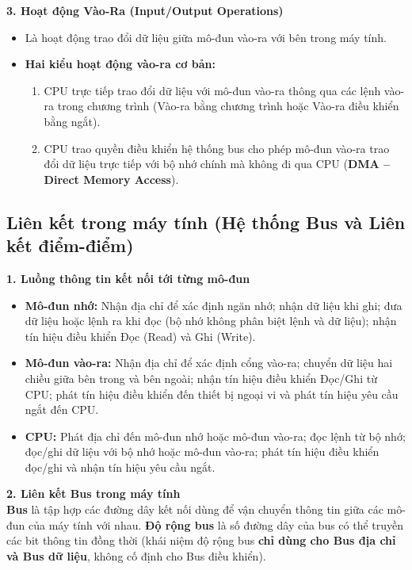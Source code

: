 \textbf{3. Hoạt động Vào-Ra (Input/Output Operations)}
\begin{itemize}
    \item Là hoạt động trao đổi dữ liệu giữa mô-đun vào-ra với bên trong máy tính.
    \item \textbf{Hai kiểu hoạt động vào-ra cơ bản:}
    \begin{enumerate}
        \item CPU trực tiếp trao đổi dữ liệu với mô-đun vào-ra thông qua các lệnh vào-ra trong chương trình (Vào-ra bằng chương trình hoặc Vào-ra điều khiển bằng ngắt).
        \item CPU trao quyền điều khiển hệ thống bus cho phép mô-đun vào-ra trao đổi dữ liệu trực tiếp với bộ nhớ chính mà không đi qua CPU (\textbf{DMA -- Direct Memory Access}).
    \end{enumerate}
\end{itemize}

\subsection{Liên kết trong máy tính (Hệ thống Bus và Liên kết điểm-điểm)}

\textbf{1. Luồng thông tin kết nối tới từng mô-đun}
\begin{itemize}
    \item \textbf{Mô-đun nhớ:} Nhận địa chỉ để xác định ngăn nhớ; nhận dữ liệu khi ghi; đưa dữ liệu hoặc lệnh ra khi đọc (bộ nhớ không phân biệt lệnh và dữ liệu); nhận tín hiệu điều khiển Đọc (Read) và Ghi (Write).
    \item \textbf{Mô-đun vào-ra:} Nhận địa chỉ để xác định cổng vào-ra; chuyển dữ liệu hai chiều giữa bên trong và bên ngoài; nhận tín hiệu điều khiển Đọc/Ghi từ CPU; phát tín hiệu điều khiển đến thiết bị ngoại vi và phát tín hiệu yêu cầu ngắt đến CPU.
    \item \textbf{CPU:} Phát địa chỉ đến mô-đun nhớ hoặc mô-đun vào-ra; đọc lệnh từ bộ nhớ; đọc/ghi dữ liệu với bộ nhớ hoặc mô-đun vào-ra; phát tín hiệu điều khiển đọc/ghi và nhận tín hiệu yêu cầu ngắt.
\end{itemize}

\textbf{2. Liên kết Bus trong máy tính}\\
\textbf{Bus} là tập hợp các đường dây kết nối dùng để vận chuyển thông tin giữa các mô-đun của máy tính với nhau. \textbf{Độ rộng bus} là số đường dây của bus có thể truyền các bit thông tin đồng thời (khái niệm độ rộng bus \textbf{chỉ dùng cho Bus địa chỉ và Bus dữ liệu}, không cố định cho Bus điều khiển).

